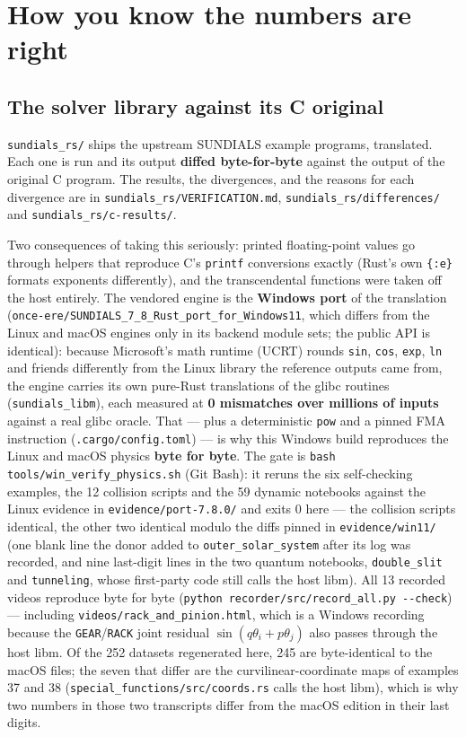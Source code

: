 \documentclass[11pt]{article}
\newcommand{\kw}[1]{\texttt{\uppercase{#1}}}
\newcommand{\code}[1]{\texttt{#1}}
\begin{document}
\section{How you know the numbers are right}

\subsection{The solver library against its C original}

\code{sundials\_rs/} ships the upstream SUNDIALS example programs,
translated. Each one is run and its output \textbf{diffed byte-for-byte}
against the output of the original C program. The results, the
divergences, and the reasons for each divergence are in
\code{sundials\_rs/VERIFICATION.md}, \code{sundials\_rs/differences/}
and \code{sundials\_rs/c-results/}.

Two consequences of taking this seriously: printed floating-point values
go through helpers that reproduce C's \code{printf} conversions exactly
(Rust's own \code{\{:e\}} formats exponents differently), and the
transcendental functions were taken off the host entirely. The vendored
engine is the \textbf{Windows port} of the translation
(\code{once-ere/SUNDIALS\_7\_8\_Rust\_port\_for\_Windows11}, which
differs from the Linux and macOS engines only in its backend module
sets; the public API is identical): because Microsoft's math runtime
(UCRT) rounds \code{sin}, \code{cos}, \code{exp}, \code{ln} and friends
differently from the Linux library the reference outputs came from, the
engine carries its own pure-Rust translations of the glibc routines
(\code{sundials\_libm}), each measured at \textbf{0 mismatches over
millions of inputs} against a real glibc oracle. That --- plus a
deterministic \code{pow} and a pinned FMA instruction
(\code{.cargo/config.toml}) --- is why this Windows build reproduces the
Linux and macOS physics \textbf{byte for byte}. The gate is
\code{bash tools/win\_verify\_physics.sh} (Git Bash): it reruns the six
self-checking examples, the 12 collision scripts and the 59 dynamic
notebooks against the Linux evidence in \code{evidence/port-7.8.0/} and
exits 0 here --- the collision scripts identical, the other two
identical modulo the diffs pinned in \code{evidence/win11/} (one blank
line the donor added to \code{outer\_solar\_system} after its log was
recorded, and nine last-digit lines in the two quantum notebooks,
\code{double\_slit} and \code{tunneling}, whose first-party code still
calls the host libm). All 13 recorded videos reproduce byte for byte
(\code{python recorder/src/record\_all.py -{}-check}) --- including
\code{videos/rack\_and\_pinion.html}, which is a Windows recording
because the \kw{gear}/\kw{rack} joint residual
$\sin(q\theta_i + p\theta_j)$ also passes through the host libm. Of the
252 datasets regenerated here, 245 are byte-identical to the macOS
files; the seven that differ are the curvilinear-coordinate maps of
examples 37 and 38 (\code{special\_functions/src/coords.rs} calls the
host libm), which is why two numbers in those two transcripts differ
from the macOS edition in their last digits.
\end{document}
